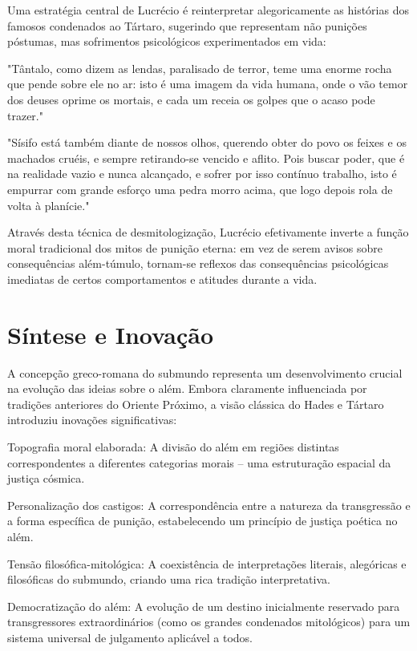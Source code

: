Uma estratégia central de Lucrécio é reinterpretar alegoricamente as histórias dos famosos condenados ao Tártaro, sugerindo que representam não punições póstumas, mas sofrimentos psicológicos experimentados em vida:

"Tântalo, como dizem as lendas, paralisado de terror, teme uma enorme rocha que pende sobre ele no ar: isto é uma imagem da vida humana, onde o vão temor dos deuses oprime os mortais, e cada um receia os golpes que o acaso pode trazer."

"Sísifo está também diante de nossos olhos, querendo obter do povo os feixes e os machados cruéis, e sempre retirando-se vencido e aflito. Pois buscar poder, que é na realidade vazio e nunca alcançado, e sofrer por isso contínuo trabalho, isto é empurrar com grande esforço uma pedra morro acima, que logo depois rola de volta à planície."

Através desta técnica de desmitologização, Lucrécio efetivamente inverte a função moral tradicional dos mitos de punição eterna: em vez de serem avisos sobre consequências além-túmulo, tornam-se reflexos das consequências psicológicas imediatas de certos comportamentos e atitudes durante a vida.


\section{Síntese e Inovação}

A concepção greco-romana do submundo representa um desenvolvimento crucial na evolução das ideias sobre o além. Embora claramente influenciada por tradições anteriores do Oriente Próximo, a visão clássica do Hades e Tártaro introduziu inovações significativas:

Topografia moral elaborada: A divisão do além em regiões distintas correspondentes a diferentes categorias morais -- uma estruturação espacial da justiça cósmica.

Personalização dos castigos: A correspondência entre a natureza da transgressão e a forma específica de punição, estabelecendo um princípio de justiça poética no além.

Tensão filosófica-mitológica: A coexistência de interpretações literais, alegóricas e filosóficas do submundo, criando uma rica tradição interpretativa.

Democratização do além: A evolução de um destino inicialmente reservado para transgressores extraordinários (como os grandes condenados mitológicos) para um sistema universal de julgamento aplicável a todos.

